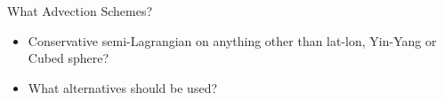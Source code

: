 \begin{slide}{What Advection Schemes?}

\begin{itemize}
\item Conservative semi-Lagrangian on anything other than lat-lon, Yin-Yang or Cubed sphere?

\item What alternatives should be used?
\end{itemize}

\end{slide}

